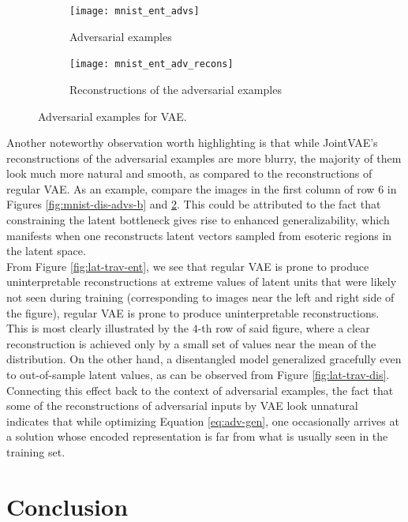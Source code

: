 \documentclass{report}
\begin{document}
\begin{figure}
\begin{subfigure}{.5\textwidth}
  \centering
  \texttt{[image: mnist\_ent\_advs]}
  \caption{Adversarial examples}
  \label{fig:mnist-ent-advs-a}
\end{subfigure}%
\begin{subfigure}{.5\textwidth}
  \centering
  \texttt{[image: mnist\_ent\_adv\_recons]}
  \caption{Reconstructions of the adversarial examples}
  \label{fig:mnist-ent-advs-b}
\end{subfigure}
\caption{Adversarial examples for VAE.}
\label{fig:mnist-ent-advs}
\end{figure}

\noindent Another noteworthy observation worth highlighting is that while JointVAE's reconstructions of the adversarial examples are more blurry, the majority of them look much more natural and smooth, as compared to the reconstructions of regular VAE. As an example, compare the images in the first column of row $6$ in Figures \ref{fig:mnist-dis-advs-b} and \ref{fig:mnist-ent-advs-b}. This could be attributed to the fact that constraining the latent bottleneck gives rise to enhanced generalizability, which manifests when one reconstructs latent vectors sampled from esoteric regions in the latent space. \\

\noindent From Figure \ref{fig:lat-trav-ent}, we see that regular VAE is prone to produce uninterpretable reconstructions at extreme values of latent units that were likely not seen during training (corresponding to images near the left and right side of the figure), regular VAE is prone to produce uninterpretable reconstructions. This is most clearly illustrated by the $4$-th row of said figure, where a clear reconstruction is achieved only by a small set of values near the mean of the distribution. On the other hand, a disentangled model generalized gracefully even to out-of-sample latent values, as can be observed from Figure \ref{fig:lat-trav-dis}. Connecting this effect back to the context of adversarial examples, the fact that some of the reconstructions of adversarial inputs by VAE look unnatural indicates that while optimizing Equation \ref{eq:adv-gen}, one occasionally arrives at a solution whose encoded representation is far from what is usually seen in the training set. 

\chapter{Conclusion}
\end{document}
